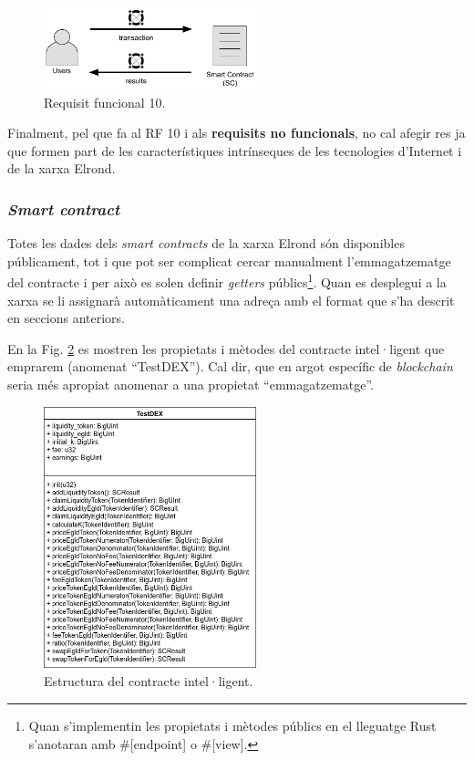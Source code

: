 \documentclass[11pt,a4paper]{article}
\begin{document}
\begin{figure}[h]
\includegraphics[width=0.55\textwidth]{cu_trans_results.png}
\centering
\caption{Requisit funcional 10.}\label{fig:transresults}
\end{figure} 

Finalment, pel que fa al RF 10 i als \textbf{requisits no funcionals}, no cal afegir res ja que formen part de les característiques intrínseques de les tecnologies d'Internet i de la xarxa Elrond.

\subsubsection{\textit{Smart contract}}\label{subsub:sc}
Totes les dades dels \textit{smart contracts} de la xarxa Elrond són disponibles públicament, tot i que pot ser complicat cercar manualment l'emmagatzematge del contracte i per això es solen definir \textit{getters} públics\footnote{Quan s'implementin les propietats i mètodes públics en el lleguatge Rust s'anotaran amb \#[endpoint] o \#[view].}. Quan es desplegui a la xarxa se li assignarà automàticament una adreça amb el format que s'ha descrit en seccions anteriors.

En la Fig. \ref{fig:testdex} es mostren les propietats i mètodes del contracte intel·ligent que emprarem (anomenat ``TestDEX''). Cal dir, que en argot específic de \textit{blockchain} seria més apropiat anomenar a una propietat ``emmagatzematge''. 

\begin{figure}[h]
\includegraphics[width=0.55\textwidth]{TestDEX.png}
\centering
\caption{Estructura del contracte intel·ligent.}\label{fig:testdex}
\end{figure} 
\end{document}
